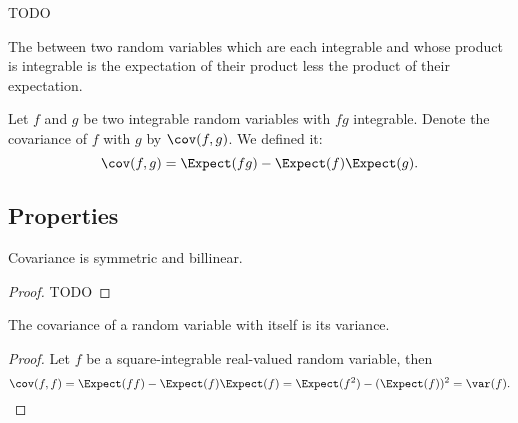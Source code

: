 
\sbasic
























\sstart
{}


TODO


The 
between two
random variables
which are each
integrable
and whose product
is integrable
is
the expectation
of their product
less the product
of their expectation.


Let $f$ and $g$
be two integrable
random variables
with $fg$ integrable.
Denote the covariance
of $f$ with $g$
by $\cov(f, g)$.
We defined it:
\[
  \cov(f, g) = \Expect(fg) - \Expect(f)\Expect(g).
\]

\subsection{Properties}

\begin{prop}
Covariance is symmetric and billinear.
\begin{proof}
  TODO
\end{proof}
\end{prop}

\begin{prop}
The covariance of
a random variable
with itself is its variance.
\begin{proof}
  Let $f$ be a square-integrable
  real-valued random variable,
  then
  \[
    \cov(f, f) = \Expect(ff) - \Expect(f)\Expect(f) = \Expect(f^2) - (\Expect(f))^2 = \var(f).
  \]
\end{proof}
\end{prop}

